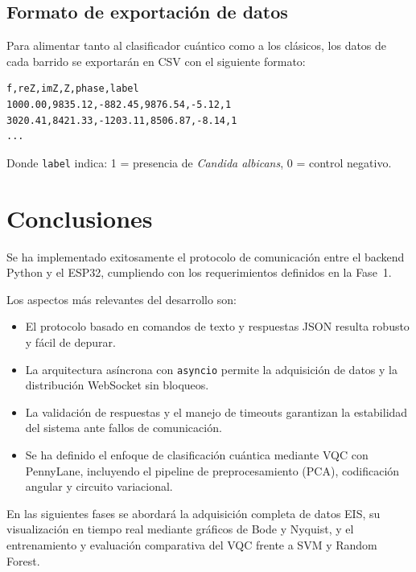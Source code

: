 \documentclass[11pt,a4paper,spanish]{book}
\begin{document}
\section{Formato de exportaci\'{o}n de datos}

Para alimentar tanto al clasificador cu\'{a}ntico como a los cl\'{a}sicos, los datos de cada barrido se exportar\'{a}n en CSV con el siguiente formato:

\begin{lstlisting}[caption={Formato CSV de exportaci\'{o}n}]
f,reZ,imZ,Z,phase,label
1000.00,9835.12,-882.45,9876.54,-5.12,1
3020.41,8421.33,-1203.11,8506.87,-8.14,1
...
\end{lstlisting}

Donde \texttt{label} indica: 1 = presencia de \textit{Candida albicans}, 0 = control negativo.


\chapter{Conclusiones}

Se ha implementado exitosamente el protocolo de comunicaci\'{o}n entre el backend Python y el ESP32, cumpliendo con los requerimientos definidos en la Fase~1.

Los aspectos m\'{a}s relevantes del desarrollo son:

\begin{itemize}
	\item El protocolo basado en comandos de texto y respuestas JSON resulta robusto y f\'{a}cil de depurar.
	\item La arquitectura as\'{i}ncrona con \texttt{asyncio} permite la adquisici\'{o}n de datos y la distribuci\'{o}n WebSocket sin bloqueos.
	\item La validaci\'{o}n de respuestas y el manejo de timeouts garantizan la estabilidad del sistema ante fallos de comunicaci\'{o}n.
	\item Se ha definido el enfoque de clasificaci\'{o}n cu\'{a}ntica mediante VQC con PennyLane, incluyendo el pipeline de preprocesamiento (PCA), codificaci\'{o}n angular y circuito variacional.
\end{itemize}

En las siguientes fases se abordar\'{a} la adquisici\'{o}n completa de datos EIS, su visualizaci\'{o}n en tiempo real mediante gr\'{a}ficos de Bode y Nyquist, y el entrenamiento y evaluaci\'{o}n comparativa del VQC frente a SVM y Random Forest.
\end{document}

